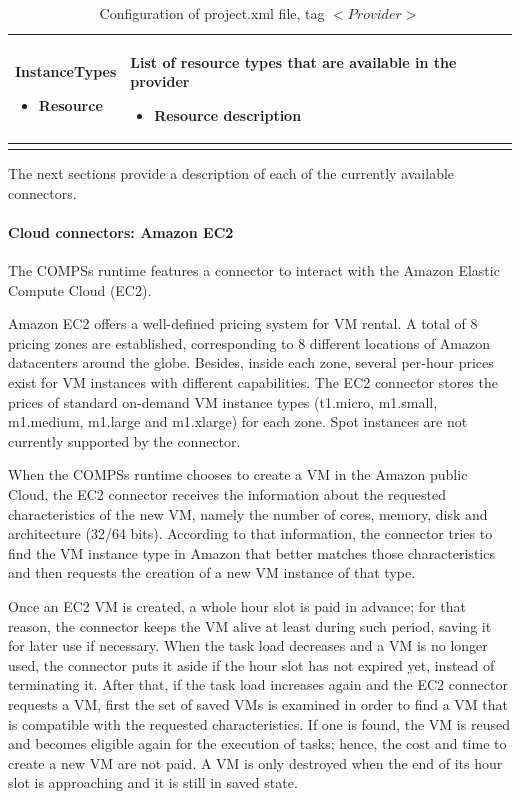 \begin{longtable}{| p{} | p{} |}
  InstanceTypes \newline
  \begin{itemize}
  \item Resource
  \end{itemize}
  & 
  List of resource types that are available in the provider
  \begin{itemize}
  \item Resource description
  \end{itemize}
  \\
  \hline
  
  \caption{Configuration of project.xml file, tag $<Provider>$}
  \label{tab:conf_project_xml_provider}
\end{longtable}

The next sections provide a description of each of the currently available connectors.

\newpage

\paragraph{Cloud connectors: Amazon EC2}
The COMPSs runtime features a connector to interact with the Amazon Elastic Compute Cloud (EC2).

Amazon EC2 offers a well-defined pricing system for VM rental. A total of 8 pricing zones are 
established, corresponding to 8 different locations of Amazon datacenters around the globe. 
Besides, inside each zone, several per-hour prices exist for VM instances with different capabilities. 
The EC2 connector stores the prices of standard on-demand VM instance types (t1.micro, m1.small, 
m1.medium, m1.large and m1.xlarge) for each zone. Spot instances are not currently supported by the connector.

When the COMPSs runtime chooses to create a VM in the Amazon public Cloud, the EC2 connector receives 
the information about the requested characteristics of the new VM, namely the number of cores, memory, 
disk and architecture (32/64 bits). According to that information, the connector tries to find the VM 
instance type in Amazon that better matches those characteristics and then requests the creation of a 
new VM instance of that type.

Once an EC2 VM is created, a whole hour slot is paid in advance; for that reason, the connector keeps 
the VM alive at least during such period, saving it for later use if necessary. When the task load 
decreases and a VM is no longer used, the connector puts it aside if the hour slot has not expired yet, 
instead of terminating it. After that, if the task load increases again and the EC2 connector requests 
a VM, first the set of saved VMs is examined in order to find a VM that is compatible with the requested 
characteristics. If one is found, the VM is reused and becomes eligible again for the execution of tasks; 
hence, the cost and time to create a new VM are not paid. A VM is only destroyed when the end of its hour 
slot is approaching and it is still in saved state.

